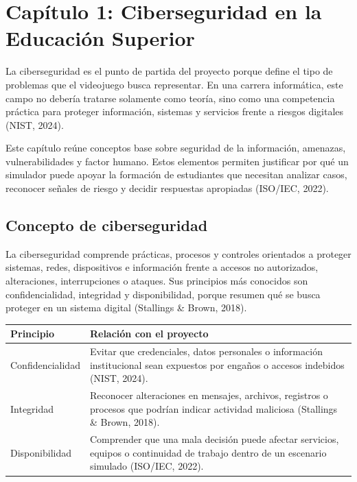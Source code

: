 \section[Cap\'{i}tulo 1: Ciberseguridad en la Educaci\'{o}n Superior]{\centering Cap\'{i}tulo 1: Ciberseguridad en la Educaci\'{o}n Superior}

La ciberseguridad es el punto de partida del proyecto porque define el tipo de problemas que el videojuego busca representar. En una carrera inform\'{a}tica, este campo no deber\'{i}a tratarse solamente como teor\'{i}a, sino como una competencia pr\'{a}ctica para proteger informaci\'{o}n, sistemas y servicios frente a riesgos digitales (NIST, 2024).

Este cap\'{i}tulo re\'{u}ne conceptos base sobre seguridad de la informaci\'{o}n, amenazas, vulnerabilidades y factor humano. Estos elementos permiten justificar por qu\'{e} un simulador puede apoyar la formaci\'{o}n de estudiantes que necesitan analizar casos, reconocer se\~{n}ales de riesgo y decidir respuestas apropiadas (ISO/IEC, 2022).

\subsection{Concepto de ciberseguridad}

La ciberseguridad comprende pr\'{a}cticas, procesos y controles orientados a proteger sistemas, redes, dispositivos e informaci\'{o}n frente a accesos no autorizados, alteraciones, interrupciones o ataques. Sus principios m\'{a}s conocidos son confidencialidad, integridad y disponibilidad, porque resumen qu\'{e} se busca proteger en un sistema digital (Stallings \& Brown, 2018).

\begin{center}
\begin{tabular}{|p{}|p{}|}
\hline
\textbf{Principio} & \textbf{Relaci\'{o}n con el proyecto} \\
\hline
Confidencialidad & Evitar que credenciales, datos personales o informaci\'{o}n institucional sean expuestos por enga\~{n}os o accesos indebidos (NIST, 2024). \\
\hline
Integridad & Reconocer alteraciones en mensajes, archivos, registros o procesos que podr\'{i}an indicar actividad maliciosa (Stallings \& Brown, 2018). \\
\hline
Disponibilidad & Comprender que una mala decisi\'{o}n puede afectar servicios, equipos o continuidad de trabajo dentro de un escenario simulado (ISO/IEC, 2022). \\
\hline
\end{tabular}
\end{center}

